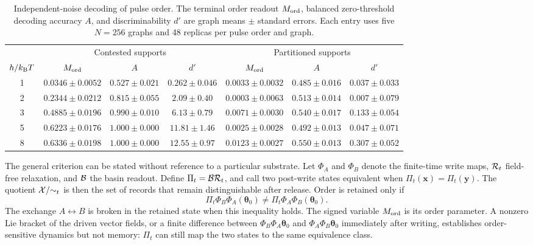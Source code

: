 \documentclass[aps,prl,onecolumn,superscriptaddress,nofootinbib]{revtex4-2}
\begin{document}
\begin{table}[ht]
\centering
\caption{\label{tab:supp-independent-order}
Independent-noise decoding of pulse order. The terminal order readout
\(M_{\rm ord}\), balanced zero-threshold decoding accuracy \(A\), and
discriminability \(d'\) are graph means \(\pm\) standard errors. Each entry
uses five \(N=256\) graphs and 48 replicas per pulse order and graph.}
\scriptsize
\setlength{\tabcolsep}{3.0pt}
\begin{tabular}{c ccc ccc}
\hline\hline
 & \multicolumn{3}{c}{Contested supports} &
   \multicolumn{3}{c}{Partitioned supports}\\
\(h/k_{\rm B}T\) & \(M_{\rm ord}\) & \(A\) & \(d'\) &
\(M_{\rm ord}\) & \(A\) & \(d'\)\\
\hline
1 & \(0.0346\pm0.0052\) & \(0.527\pm0.021\) & \(0.262\pm0.046\) &
    \(0.0033\pm0.0032\) & \(0.485\pm0.016\) & \(0.037\pm0.033\)\\
2 & \(0.2344\pm0.0212\) & \(0.815\pm0.055\) & \(2.09\pm0.40\) &
    \(0.0003\pm0.0063\) & \(0.513\pm0.014\) & \(0.007\pm0.079\)\\
3 & \(0.4885\pm0.0196\) & \(0.990\pm0.010\) & \(6.13\pm0.79\) &
    \(0.0071\pm0.0030\) & \(0.540\pm0.017\) & \(0.133\pm0.054\)\\
5 & \(0.6223\pm0.0176\) & \(1.000\pm0.000\) & \(11.81\pm1.46\) &
    \(0.0025\pm0.0028\) & \(0.492\pm0.013\) & \(0.047\pm0.071\)\\
8 & \(0.6336\pm0.0198\) & \(1.000\pm0.000\) & \(12.55\pm0.97\) &
    \(0.0123\pm0.0027\) & \(0.550\pm0.013\) & \(0.307\pm0.052\)\\
\hline\hline
\end{tabular}
\end{table}

The general criterion can be stated without reference to a particular
substrate.  Let \(\Phi_A\) and \(\Phi_B\) denote the finite-time write maps,
\({\cal R}_t\) field-free relaxation, and \({\cal B}\) the basin readout.
Define \(\Pi_t={\cal B}{\cal R}_t\), and call two post-write states equivalent
when \(\Pi_t(\bm x)=\Pi_t(\bm y)\).  The quotient
\({\cal X}/{\sim_t}\) is then the set of records that remain distinguishable
after release.  Order is retained only if
\begin{equation}
 \Pi_t\Phi_B\Phi_A(\bm\theta_0)\ne
 \Pi_t\Phi_A\Phi_B(\bm\theta_0).
 \label{eq:supp-order-map}
\end{equation}
The exchange \(A\leftrightarrow B\) is broken in the retained state when this
inequality holds.  The signed variable \(M_{\rm ord}\) is its order parameter.
A nonzero Lie bracket of the driven vector fields, or a finite difference
between \(\Phi_B\Phi_A\bm\theta_0\) and
\(\Phi_A\Phi_B\bm\theta_0\) immediately after writing, establishes
order-sensitive dynamics but not memory: \(\Pi_t\) can still map the two
states to the same equivalence class.
\end{document}
